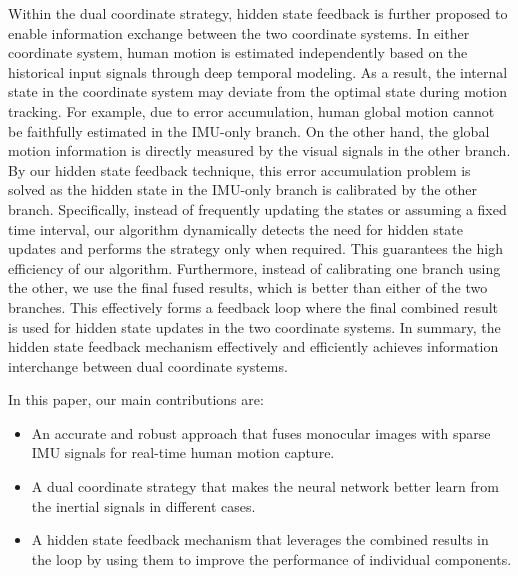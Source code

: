 \documentclass[sigconf,nonacm=true]{acmart}
\begin{document}
\par
Within the dual coordinate strategy, hidden state feedback is further proposed to enable information exchange between the two coordinate systems.
In either coordinate system, human motion is estimated independently based on the historical input signals through deep temporal modeling.
As a result, the internal state in the coordinate system may deviate from the optimal state during motion tracking. 
For example, due to error accumulation, human global motion cannot be faithfully estimated
in the IMU-only branch.
On the other hand, the global motion information is directly measured by the visual signals in the other branch.
By our hidden state feedback technique, this error accumulation problem is solved as the hidden state in the IMU-only branch is calibrated by the other branch.
Specifically, instead of frequently updating the states or assuming a fixed time interval, our algorithm dynamically detects the need for hidden state updates and performs the strategy only when required.
This guarantees the high efficiency of our algorithm.
Furthermore, instead of calibrating one branch using the other, we use the final fused results, which is better than either of the two branches.
This effectively forms a feedback loop where the final combined result is used for hidden state updates in the two coordinate systems.
In summary, the hidden state feedback mechanism effectively and efficiently achieves information interchange between dual coordinate systems.














In this paper, our main contributions are:
\begin{itemize}
    \item An accurate and robust approach that fuses monocular images with sparse IMU signals for real-time human motion capture.
    \item A dual coordinate strategy that makes the neural network better learn from the inertial signals in different cases.
    \item A hidden state feedback mechanism that leverages the combined results in the loop by using them to improve the performance of individual components.
\end{itemize}
\end{document}
